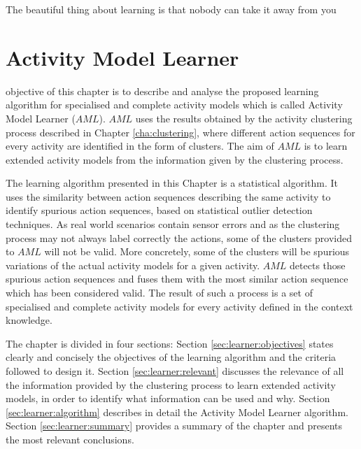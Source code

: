 

\begin{savequote}[50mm]
The beautiful thing about learning is that nobody can take it away from you
\end{savequote}


\chapter{Activity Model Learner}
\label{cha:learner}

\ifpdf
    \graphicspath{{5_activity_model_learner/figures/PDF/}{5_activity_model_learner/figures/PNG/}{5_activity_model_learner/figures/}}
\else
    \graphicspath{{5_activity_model_learner/figures/EPS/}{5_activity_model_learner/figures/}}
\fi

 objective of this chapter is to describe and analyse the proposed learning algorithm for specialised and complete activity models which is called Activity Model Learner ($AML$). $AML$ uses the results obtained by the activity clustering process described in Chapter \ref{cha:clustering}, where different action sequences for every activity are identified in the form of clusters. The aim of $AML$ is to learn extended activity models from the information given by the clustering process.

The learning algorithm presented in this Chapter is a statistical algorithm. It uses the similarity between action sequences describing the same activity to identify spurious action sequences, based on statistical outlier detection techniques. As real world scenarios contain sensor errors and as the clustering process may not always label correctly the actions, some of the clusters provided to $AML$ will not be valid. More concretely, some of the clusters will be spurious variations of the actual activity models for a given activity. $AML$ detects those spurious action sequences and fuses them with the most similar action sequence which has been considered valid. The result of such a process is a set of specialised and complete activity models for every activity defined in the context knowledge. 

The chapter is divided in four sections: Section \ref{sec:learner:objectives} states clearly and concisely the objectives of the learning algorithm and the criteria followed to design it. Section \ref{sec:learner:relevant} discusses the relevance of all the information provided by the clustering process to learn extended activity models, in order to identify what information can be used and why. Section \ref{sec:learner:algorithm} describes in detail the Activity Model Learner algorithm. Section \ref{sec:learner:summary} provides a summary of the chapter and presents the most relevant conclusions.